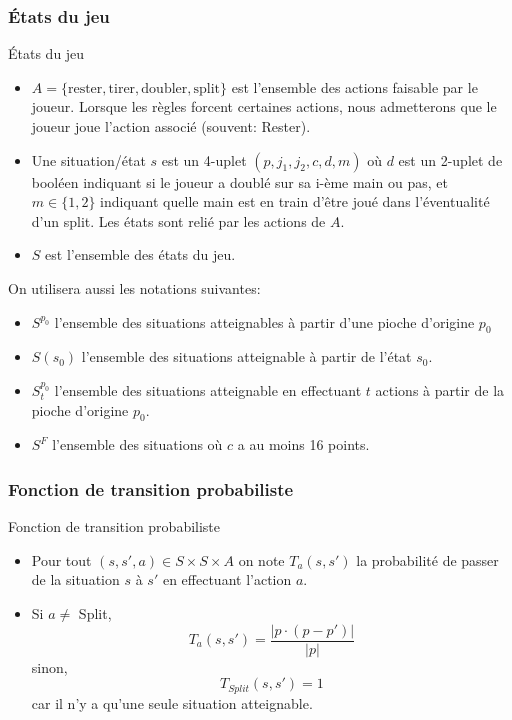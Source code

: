\documentclass{beamer}
\begin{document}
\subsubsection{États du jeu}

\begin{frame}{États du jeu}
	\begin{itemize}
		\item $A = \{\text{rester},\text{tirer}, \text{doubler}, \text{split} \}$ est l'ensemble des actions faisable par le joueur. Lorsque les règles forcent certaines actions, nous admetterons que le joueur joue l'action associé (souvent: Rester).
		\item Une situation/état $s$ est un 4-uplet $(p, j_1, j_2, c, d, m)$ où $d$ est un 2-uplet de booléen indiquant si le joueur a doublé sur sa i-ème main ou pas, et $m \in \{1,2\}$ indiquant quelle main est en train d'être joué dans l'éventualité d'un split. Les états sont relié par les actions de $A$.
		\item $S$ est l'ensemble des états du jeu.
	\end{itemize}
\end{frame}

\begin{frame}
	On utilisera aussi les notations suivantes:
	\begin{itemize}
		\item $S^{p_0}$ l'ensemble des situations atteignables à partir d'une pioche d'origine $p_0$
		\item $S(s_0)$ l'ensemble des situations atteignable à partir de l'état $s_0$.
		\item $S_t^{p_0}$ l'ensemble des situations atteignable en effectuant $t$ actions à partir de la pioche d'origine $p_0$.
		\item $S^F$ l'ensemble des situations où $c$ a au moins 16 points.
	\end{itemize}
\end{frame}

\subsubsection{Fonction de transition probabiliste}

\begin{frame}{Fonction de transition probabiliste}

	\begin{itemize}
		\item Pour tout $(s,s',a) \in S\times S\times A$ on note $T_a(s,s')$ la probabilité de passer de la situation $s$ à $s'$ en effectuant l'action $a$.
		\item Si $a \neq$ Split, $$T_a(s,s') = \frac{|p\cdot (p - p')|}{|p|}$$
			sinon, $$T_{Split}(s,s') = 1$$ car il n'y a qu'une seule situation atteignable.
	\end{itemize}
\end{frame}
\end{document}
